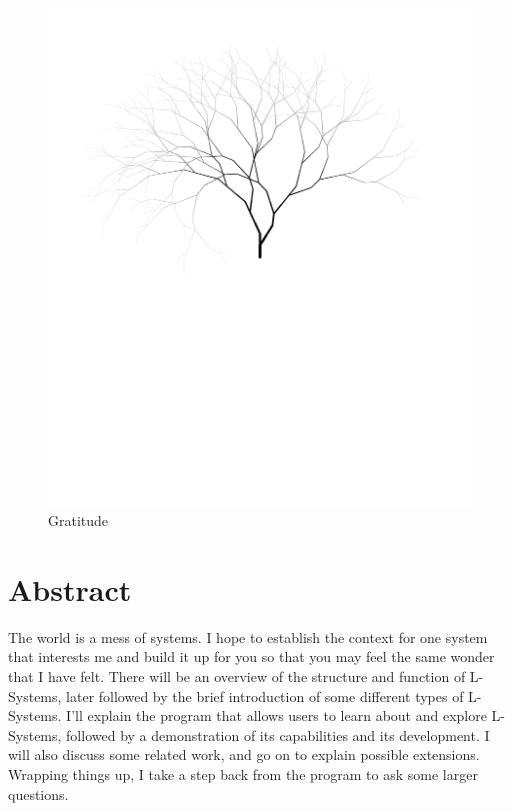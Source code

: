 \documentclass[12pt,twoside]{reedthesis}
\begin{document}
	\begin{figure}[h]
	\centering
	\includegraphics[clip=true, viewport=1in 5.5in 9in 11in, scale=0.8]{Images/Acknowledgements1}
	\caption[Gratitude]{Gratitude\footnotemark}
	\label {Acknowledgements1}
	\end{figure}
	


    \tableofcontents
	\listoffigures

\chapter*{Abstract}
	The world is a mess of systems. I hope to establish the context for one system that interests me and build it up for you so that you may feel the same wonder that I have felt. There will be an overview of the structure and function of L-Systems, later followed by the brief introduction of some different types of L-Systems. I'll explain the program that allows users to learn about and explore L-Systems, followed by a demonstration of its capabilities and its development. I will also discuss some related work, and go on to explain possible extensions. Wrapping things up, I take a step back from the program to ask some larger questions.
	
\end{document}
